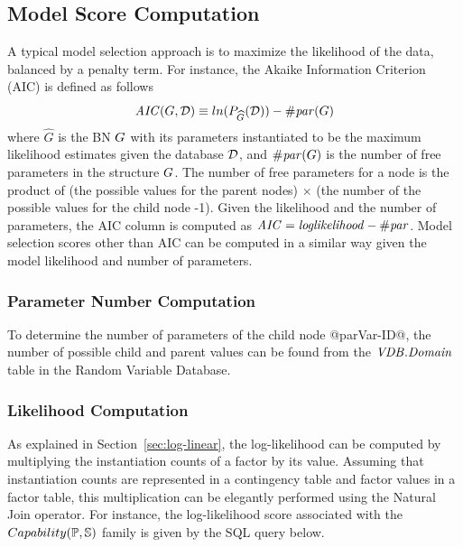 \subsection{Model Score Computation} \label{sec:model-score}
A typical model selection approach is to maximize the likelihood of the data, balanced by a penalty term. For instance, the Akaike Information Criterion (AIC) is defined as follows %
\[
\mathit{AIC}(\G,\D) \equiv ln(P_{\widehat{G}}(\D)) - \parameters(\G) \]
where $\widehat{G}$ is the BN $\G$ with its parameters instantiated to be the maximum likelihood estimates given the database $\D$, and $\parameters(\G)$ is the number of free parameters in the structure $\G$. 
The number of free parameters for a node is the product of (the possible values for the parent nodes) $\times$ (the number of the possible values for the child node -1). Given the likelihood and the number of parameters, the AIC column is computed as $\aic = \loglikelihood - \parameters$. 
 Model selection scores other than AIC can be computed in a similar way given the model likelihood and number of parameters.

\subsubsection{Parameter Number Computation} To determine the number of parameters of the child node @parVar-ID@, the number of possible child and parent values can be found from the $\it{\RVD.Domain}$ table in the Random Variable Database.  

\subsubsection{Likelihood Computation} As explained in Section~\ref{sec:log-linear}, the log-likelihood can be computed by multiplying the instantiation counts of a factor by its value. Assuming that instantiation counts are represented in a contingency table and factor values in a factor table, this multiplication can be elegantly performed using the Natural Join operator. For instance, the log-likelihood score associated with the $Capability(\P,\S)$ family is given by the SQL query below.

